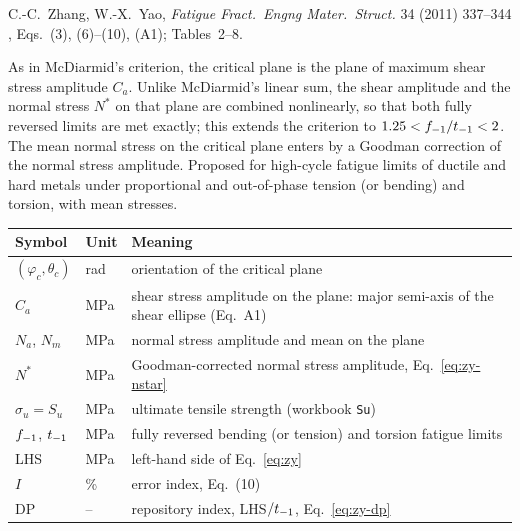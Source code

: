 \label{sheet:ZHANGYAO}

 C.-C.~Zhang, W.-X.~Yao, \emph{Fatigue Fract.\ Engng Mater.\ Struct.} 34 (2011)
337--344 \cite{zhang2011}, Eqs.~(3), (6)--(10), (A1); Tables~2--8.

 As in McDiarmid's criterion, the critical plane is the plane of maximum shear
stress amplitude $C_a$. Unlike McDiarmid's linear sum, the shear amplitude and the normal stress $N^*$
on that plane are combined nonlinearly, so that both fully reversed limits are met exactly; this
extends the criterion to $1.25<f_{-1}/t_{-1}<2$. The mean normal stress on the critical plane enters by a
Goodman correction of the normal stress amplitude. Proposed for high-cycle fatigue limits of ductile
and hard metals under proportional and out-of-phase tension (or bending) and torsion, with mean
stresses.

\begin{center}\small
\begin{tabular}{@{}llp{100mm}@{}}
\toprule
Symbol & Unit & Meaning\\\midrule
$(\varphi_c,\theta_c)$ & rad & orientation of the critical plane\\
$C_a$ & MPa & shear stress amplitude on the plane: major semi-axis of the shear ellipse (Eq.~A1)\\
$N_a$, $N_m$ & MPa & normal stress amplitude and mean on the plane\\
$N^*$ & MPa & Goodman-corrected normal stress amplitude, Eq.~\eqref{eq:zy-nstar}\\
$\sigma_u=S_u$ & MPa & ultimate tensile strength (workbook \texttt{Su})\\
$f_{-1}$, $t_{-1}$ & MPa & fully reversed bending (or tension) and torsion fatigue limits\\
LHS & MPa & left-hand side of Eq.~\eqref{eq:zy}\\
$I$ & \% & error index, Eq.~(10)\\
$\mathrm{DP}$ & -- & repository index, LHS$/t_{-1}$, Eq.~\eqref{eq:zy-dp}\\
\bottomrule
\end{tabular}
\end{center}

